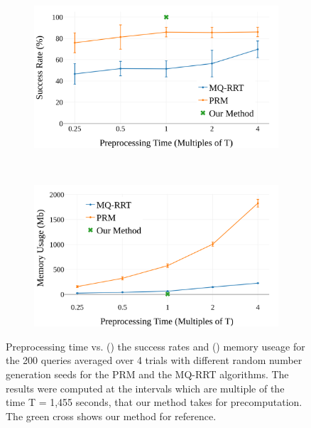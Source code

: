 \documentclass[letterpaper]{article} %
\begin{document}
\begin{figure}
    \centering
    \begin{subfigure}[b]{0.45\textwidth}
        \includegraphics[width=\textwidth]{success.png}
        \caption{}
        \label{fig:success}
    \end{subfigure}
    ~ %
    \begin{subfigure}[b]{0.45\textwidth}
        \includegraphics[width=\textwidth]{memory.png}
        \caption{}
        \label{fig:memory}
    \end{subfigure}
    \caption{Preprocessing time vs. () the success rates and () memory useage for the 200 queries averaged over 4 trials with different random number generation seeds for the PRM and the MQ-RRT algorithms. The results were computed at the intervals which are multiple of the time T = 1,455 seconds, that our method takes for precomputation. The green cross shows our method for reference.}
    \label{fig:plots}
\end{figure}
\end{document}
